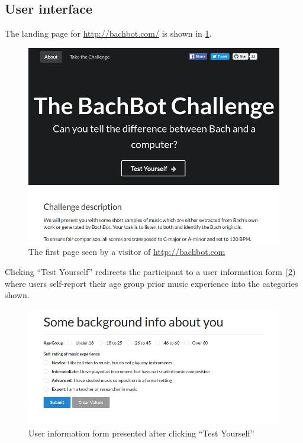 \subsection{User interface}

The landing page for \url{http://bachbot.com/} is shown in \cref{fig:bachbot-front-page}.

\begin{figure}[tb]
  \centering
  \includegraphics[width=1.0\linewidth]{bachbot-front-page.png}
  \caption{The first page seen by a visitor of \url{http://bachbot.com}}
  \label{fig:bachbot-front-page}
\end{figure}

Clicking ``Test Yourself'' redirects the participant to a user information form
(\cref{fig:user-info-form}) where users self-report their age
group prior music experience into the categories shown.

\begin{figure}[tb]
  \centering
  \includegraphics[width=1.0\linewidth]{user-info-form.png}
  \caption{User information form presented after clicking ``Test Yourself''}
  \label{fig:user-info-form}
\end{figure}

